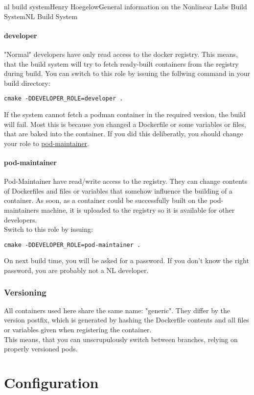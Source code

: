 \documentclass[11pt]{article}
\begin{document}
\begin{Name}{1}{nl build system}{Henry Hoegelow}{General information on the Nonlinear Labs Build System}{NL Build System}
\paragraph{developer}
"Normal" developers have only read access to the docker registry. This means, that the build system will try to fetch ready-built containers from the registry during build. You can switch to this role by issuing the follwing command in your build directory:
\begin{verbatim}
cmake -DDEVELOPER_ROLE=developer .
\end{verbatim}
If the system cannot fetch a podman container in the required version, the build will fail. Most this is because you changed a Dockerfile or some variables or files, that are baked into the container. If you did this deliberatly, you should change your role to \hyperref[pod-maintainer]{pod-maintainer}.

\paragraph{pod-maintainer} \label{pod-maintainer}
Pod-Maintainer have read/write access to the registry. They can change contents of Dockerfiles and files or variables that somehow influence the building of a container. As soon, as a container could be successfully built on the pod-maintainers machine, it is uploaded to the registry so it is available for other developers.\\
Switch to this role by issuing:
\begin{verbatim}
cmake -DDEVELOPER_ROLE=pod-maintainer .
\end{verbatim}
On next build time, you will be asked for a password. If you don't know the right password, you are probably not a NL developer.

\subsubsection{Versioning}
All containers used here share the same name: "generic". They differ by the version postfix, which is generated by hashing the Dockerfile contents and all files or variables given when registering the container.\\
This means, that you can unscrupulously switch between branches, relying on properly versioned pods.

\section{Configuration}


\end{Name}
\end{document}

